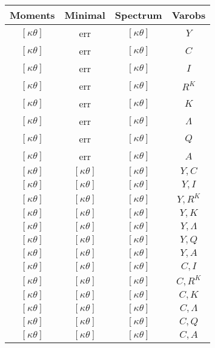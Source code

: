 \documentclass[a4paper,10pt]{article}
\begin{document}
\centering
\begin{longtable}{|c|c|c|c|}
\hline
Moments & Minimal & Spectrum & Varobs \\
\hline
$[\kappa \theta ]$ & err & $[\kappa \theta ]$ & ${Y}$ \\
\hline
$[\kappa \theta ]$ & err & $[\kappa \theta ]$ & ${C}$ \\
\hline
$[\kappa \theta ]$ & err & $[\kappa \theta ]$ & ${I}$ \\
\hline
$[\kappa \theta ]$ & err & $[\kappa \theta ]$ & ${R^{K}}$ \\
\hline
$[\kappa \theta ]$ & err & $[\kappa \theta ]$ & ${K}$ \\
\hline
$[\kappa \theta ]$ & err & $[\kappa \theta ]$ & ${\Lambda}$ \\
\hline
$[\kappa \theta ]$ & err & $[\kappa \theta ]$ & ${Q}$ \\
\hline
$[\kappa \theta ]$ & err & $[\kappa \theta ]$ & ${A}$ \\
\hline
$[\kappa \theta ]$ & $[\kappa \theta ]$ & $[\kappa \theta ]$ & ${Y},{C}$ \\
\hline
$[\kappa \theta ]$ & $[\kappa \theta ]$ & $[\kappa \theta ]$ & ${Y},{I}$ \\
\hline
$[\kappa \theta ]$ & $[\kappa \theta ]$ & $[\kappa \theta ]$ & ${Y},{R^{K}}$ \\
\hline
$[\kappa \theta ]$ & $[\kappa \theta ]$ & $[\kappa \theta ]$ & ${Y},{K}$ \\
\hline
$[\kappa \theta ]$ & $[\kappa \theta ]$ & $[\kappa \theta ]$ & ${Y},{\Lambda}$ \\
\hline
$[\kappa \theta ]$ & $[\kappa \theta ]$ & $[\kappa \theta ]$ & ${Y},{Q}$ \\
\hline
$[\kappa \theta ]$ & $[\kappa \theta ]$ & $[\kappa \theta ]$ & ${Y},{A}$ \\
\hline
$[\kappa \theta ]$ & $[\kappa \theta ]$ & $[\kappa \theta ]$ & ${C},{I}$ \\
\hline
$[\kappa \theta ]$ & $[\kappa \theta ]$ & $[\kappa \theta ]$ & ${C},{R^{K}}$ \\
\hline
$[\kappa \theta ]$ & $[\kappa \theta ]$ & $[\kappa \theta ]$ & ${C},{K}$ \\
\hline
$[\kappa \theta ]$ & $[\kappa \theta ]$ & $[\kappa \theta ]$ & ${C},{\Lambda}$ \\
\hline
$[\kappa \theta ]$ & $[\kappa \theta ]$ & $[\kappa \theta ]$ & ${C},{Q}$ \\
\hline
$[\kappa \theta ]$ & $[\kappa \theta ]$ & $[\kappa \theta ]$ & ${C},{A}$ \\

\end{longtable}
\end{document}
